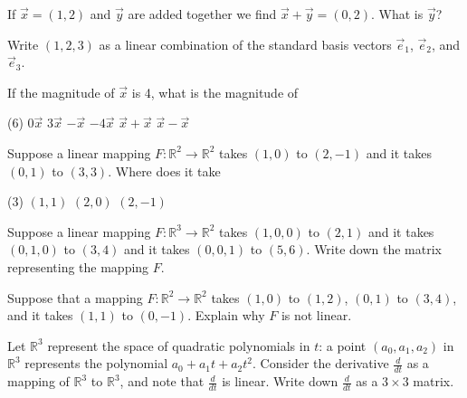 \begin{exercise}
If $\vec{x} = (1,2)$ and $\vec{y}$ are added together we find
$\vec{x}+\vec{y} = (0,2)$.  What is $\vec{y}$?
\end{exercise}

\begin{exercise}
Write $(1,2,3)$ as a linear combination of the standard basis vectors
$\vec{e}_1$, $\vec{e}_2$, and $\vec{e}_3$.
\end{exercise}

\begin{exercise}
If the magnitude of $\vec{x}$ is 4, what is the magnitude of
\begin{tasks}(6)
\task
$0\vec{x}$
\task
$3\vec{x}$
\task
$-\vec{x}$
\task
$-4\vec{x}$
\task
$\vec{x}+\vec{x}$
\task
$\vec{x}-\vec{x}$
\end{tasks}
\end{exercise}

\begin{exercise}
Suppose a linear mapping $F \colon {\mathbb R}^2 \to {\mathbb R}^2$
takes $(1,0)$ to $(2,-1)$ and it takes $(0,1)$ to $(3,3)$. 
Where does it take
\begin{tasks}(3)
\task
$(1,1)$
\task
$(2,0)$
\task
$(2,-1)$
\end{tasks}
\end{exercise}

\begin{exercise}
Suppose a linear mapping $F \colon {\mathbb R}^3 \to {\mathbb R}^2$
takes $(1,0,0)$ to $(2,1)$ and it takes $(0,1,0)$ to $(3,4)$ and
it takes $(0,0,1)$ to $(5,6)$.  Write down the matrix representing
the mapping $F$.
\end{exercise}

\begin{exercise}
Suppose that a mapping $F \colon {\mathbb R}^2 \to \mathbb{R}^2$ takes
$(1,0)$ to $(1,2)$, $(0,1)$ to $(3,4)$, and it takes $(1,1)$ to $(0,-1)$.
Explain why $F$ is not linear.
\end{exercise}

\begin{exercise}[Challenging]
Let ${\mathbb R}^3$ represent the space of quadratic polynomials
in $t$: a point $(a_0,a_1,a_2)$ in ${\mathbb R}^3$ represents
the polynomial $a_0 + a_1 t + a_2 t^2$.
Consider the derivative $\frac{d}{dt}$ as a mapping of ${\mathbb R}^3$ to
${\mathbb R}^3$,
and note that $\frac{d}{dt}$ is linear.
Write down $\frac{d}{dt}$ as a $3 \times 3$ matrix.
\end{exercise}

